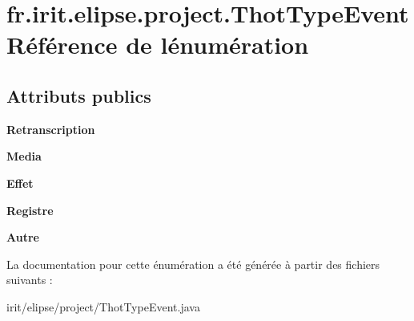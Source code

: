 \hypertarget{enumfr_1_1irit_1_1elipse_1_1project_1_1_thot_type_event}{}\section{fr.\+irit.\+elipse.\+project.\+Thot\+Type\+Event Référence de l\textquotesingle{}énumération}
\label{enumfr_1_1irit_1_1elipse_1_1project_1_1_thot_type_event}
\subsection*{Attributs publics}
\begin{DoxyCompactItemize}
\item 
\mbox{\label{enumfr_1_1irit_1_1elipse_1_1project_1_1_thot_type_event_aea5c880df5e681945c87c72ebe59aa68}} 
{\bfseries Retranscription}
\item 
\mbox{\label{enumfr_1_1irit_1_1elipse_1_1project_1_1_thot_type_event_a4bf5b5ad0f335e8c57c597cbbe99d06e}} 
{\bfseries Media}
\item 
\mbox{\label{enumfr_1_1irit_1_1elipse_1_1project_1_1_thot_type_event_ae557a09541b19d0adbf2df1c856e1b44}} 
{\bfseries Effet}
\item 
\mbox{\label{enumfr_1_1irit_1_1elipse_1_1project_1_1_thot_type_event_a6ca55ccb8800eb251eb4507247341a7a}} 
{\bfseries Registre}
\item 
\mbox{\label{enumfr_1_1irit_1_1elipse_1_1project_1_1_thot_type_event_a41e9df52464ad6ea82e31e1b7478b82c}} 
{\bfseries Autre}
\end{DoxyCompactItemize}


La documentation pour cette énumération a été générée à partir des fichiers suivants \+:\begin{DoxyCompactItemize}
\item 
irit/elipse/project/Thot\+Type\+Event.\+java\end{DoxyCompactItemize}
